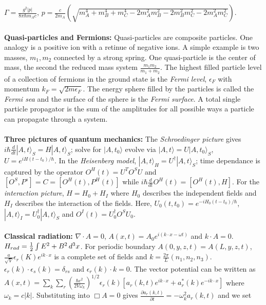 $\Gamma= {\frac {g^2 |p|} {8 \pi \hbar m_A c}}$,
$p= {\frac {c} {2 m_A}} ({\sqrt {
m_A^4+
m_B^4+
m_C^4 -2m_A^2m_B^2 -2m_B^2m_C^2 -2m_A^2m_C^2 }})$.
\\
\\
{\bf Quasi-particles and Fermions:}  Quasi-particles are composite particles.  One analogy is a positive ion
with a retinue of negative ions.  A simple example is two masses, $m_1, m_2$ connected by a strong spring.  One
quasi-particle is the center of mass, the second the reduced mass system ${\frac {m_1 m_2}{m_1+m_2}}$.
The highest filled particle level of a collection of fermions in the ground state is the \emph{Fermi level},
$\epsilon_F$ with momentum $k_F= {\sqrt {2m \epsilon_F}}$.  The energy sphere filled by the particles is called the
\emph{Fermi sea} and the surface of the sphere is the \emph{Fermi surface}.  A total single particle
propagator is the sum of the amplitudes for all possible ways a particle can propagate through a system.
\\
\\
{\bf Three pictures of quantum mechanics:}
The \emph{Schroedinger picture} gives $i \hbar {\frac {d}{dt}} |A,t\rangle_S= H|A,t\rangle_S$; solve for
$|A, t_0\rangle$ evolve via $|A,t\rangle = U |A, t_0\rangle_S$, $U= e^{iH(t-t_0 )/ \hbar}$.
In the \emph{Heisenberg model}, $|A,t\rangle_H = U^{\dagger} |A, t\rangle_S$; time dependance is captured
by the operator $O^H(t)= U^T O^S U$ and $[O^S, P^s]= C = [O^H(t), P^H(t)]$ while
$i \hbar {\frac {d} {dt}}O^H(t)= [O^H(t), H]$.  For the \emph{interaction picture},
$H= H_0 +H_I$ where $H_0$ describes the independent fields and $H_I$ describes the interaction of the fields.
Here, $U_0(t, t_0)= e^{-iH_0(t-t_0)/\hbar}$, $|A,t\rangle_I = U_0^{\dagger} |A,t\rangle_S$ and
$O^I(t)= U_0^{\dagger} O^S U_0$.
\\
\\
{\bf Classical radiation:}
$\nabla \cdot A = 0$, $A(x,t)= A_0 e^{i(k \cdot x - \omega t)}$ and $k \cdot A=0$.  
$H_{rad}= {\frac 1 2} \int E^2 +B^2 \thinspace d^3 x$.  For periodic boundary $A(0,y,z,t)=A(L,y,z,t)$,
${\frac a {\sqrt V}} \epsilon_r(K) e^{i k \cdot x}$ is a complete set of 
fields and $k= {\frac {2 \pi} L} (n_1, n_2, n_3)$.  $\epsilon_r(k) \cdot \epsilon_s(k) = \delta_{rs}$ and
$\epsilon_r(k) \cdot k=0$.  The vector potential can be written as 
$A(x,t)= \sum_k \sum_r ({\frac {\hbar c^2}{2 V \omega_k}})^{1/2} \epsilon_r(k)
[a_r(k,t) e^{ik\cdot x} + a_r^*(k)e^{-ik \cdot x}]$ where $\omega_k= c |k|$.  Substituting into
$\Box A= 0$ gives ${\frac {\partial a_r(k,t)} {\partial t}}= -\omega_k^2 a_r(k,t)$ and we set
